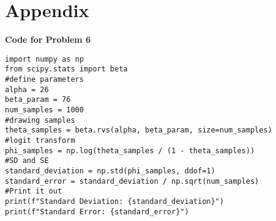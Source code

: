 \documentclass{article}
\begin{document}
\section*{Appendix}
\noindent
\textbf{Code for Problem 6}
\begin{verbatim}
import numpy as np
from scipy.stats import beta
#define parameters
alpha = 26
beta_param = 76
num_samples = 1000
#drawing samples
theta_samples = beta.rvs(alpha, beta_param, size=num_samples)
#logit transform
phi_samples = np.log(theta_samples / (1 - theta_samples))
#SD and SE
standard_deviation = np.std(phi_samples, ddof=1)
standard_error = standard_deviation / np.sqrt(num_samples)
#Print it out
print(f"Standard Deviation: {standard_deviation}")
print(f"Standard Error: {standard_error}")
\end{verbatim}
\end{document}
